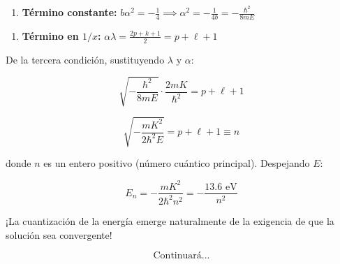 \documentclass[a4paper]{article}
\begin{document}
\begin{enumerate}
\item \textbf{Término constante:} $b\alpha^2 = -\frac{1}{4} \implies \alpha^2 = -\frac{1}{4b} = -\frac{\hbar^2}{8mE}$
\end{enumerate}

\begin{enumerate}
\item \textbf{Término en $1/x$:} $\alpha\lambda = \frac{2p+k+1}{2} = p + \ell + 1$
\end{enumerate}

De la tercera condición, sustituyendo $\lambda$ y $\alpha$:

\[
\sqrt{-\frac{\hbar^2}{8mE}}\cdot\frac{2mK}{\hbar^2} = p + \ell + 1
\]

\[
\sqrt{-\frac{mK^2}{2\hbar^2 E}} = p + \ell + 1 \equiv n
\]

donde $n$ es un entero positivo (número cuántico principal). Despejando $E$:

\[
E_n = -\frac{mK^2}{2\hbar^2 n^2} = -\frac{13.6 \text{ eV}}{n^2}
\]

¡La cuantización de la energía emerge naturalmente de la exigencia de que la solución sea convergente!

\[
\boxed{\text{Continuará...}}
\]
\end{document}
